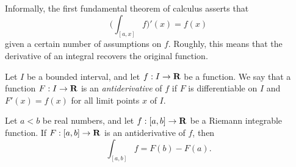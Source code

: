 \begin{note}
  Informally, the first fundamental theorem of calculus asserts that
  \[
    \bigg(\int_{[a, x]} f\bigg)'(x) = f(x)
  \]
  given a certain number of assumptions on \(f\).
  Roughly, this means that the derivative of an integral recovers the original function.
\end{note}

\setcounter{theorem}{2}
\begin{definition}[Antiderivatives]\label{11.9.3}
  Let \(I\) be a bounded interval, and let \(f : I \to \mathbf{R}\) be a function.
  We say that a function \(F : I \to \mathbf{R}\) is an \emph{antiderivative} of \(f\) if \(F\) is differentiable on \(I\) and \(F'(x) = f(x)\) for all limit points \(x\) of \(I\).
\end{definition}

\begin{theorem}\label{11.9.4}
  Let \(a < b\) be real numbers, and let \(f : [a, b] \to \mathbf{R}\) be a Riemann integrable function.
  If \(F : [a, b] \to \mathbf{R}\) is an antiderivative of \(f\), then
  \[
    \int_{[a, b]} f = F(b) - F(a).
  \]
\end{theorem}

